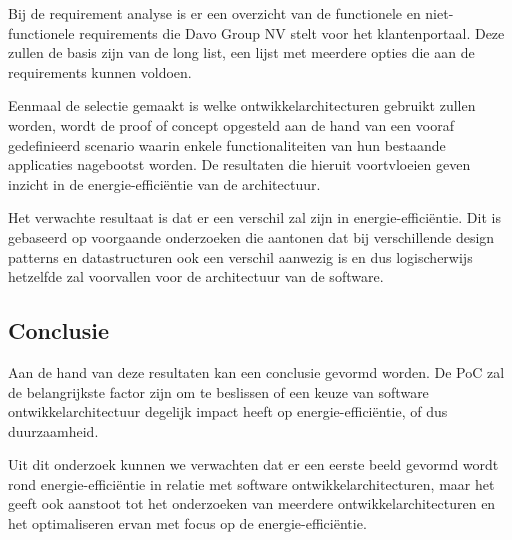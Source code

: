 Bij de requirement analyse is er een overzicht van de functionele en niet-functionele requirements die Davo Group NV stelt voor het klantenportaal. Deze zullen de basis zijn van de long list, een lijst met meerdere opties die aan de requirements kunnen voldoen. 

Eenmaal de selectie gemaakt is welke ontwikkelarchitecturen gebruikt zullen worden, wordt de proof of concept opgesteld aan de hand van een vooraf gedefinieerd scenario waarin enkele functionaliteiten van hun bestaande applicaties nagebootst worden. De resultaten die hieruit voortvloeien geven inzicht in de energie-efficiëntie van de architectuur.

Het verwachte resultaat is dat er een verschil zal zijn in energie-efficiëntie. Dit is gebaseerd op voorgaande onderzoeken die aantonen dat bij verschillende design patterns en datastructuren ook een verschil aanwezig is en dus logischerwijs hetzelfde zal voorvallen voor de architectuur van de software.

\subsection{Conclusie}
Aan de hand van deze resultaten kan een conclusie gevormd worden. De PoC zal de belangrijkste factor zijn om te beslissen of een keuze van software ontwikkelarchitectuur degelijk impact heeft op energie-efficiëntie, of dus duurzaamheid.

Uit dit onderzoek kunnen we verwachten dat er een eerste beeld gevormd wordt rond energie-efficiëntie in relatie met software ontwikkelarchitecturen, maar het geeft ook aanstoot tot het onderzoeken van meerdere ontwikkelarchitecturen en het optimaliseren ervan met focus op de energie-efficiëntie.
%
%

